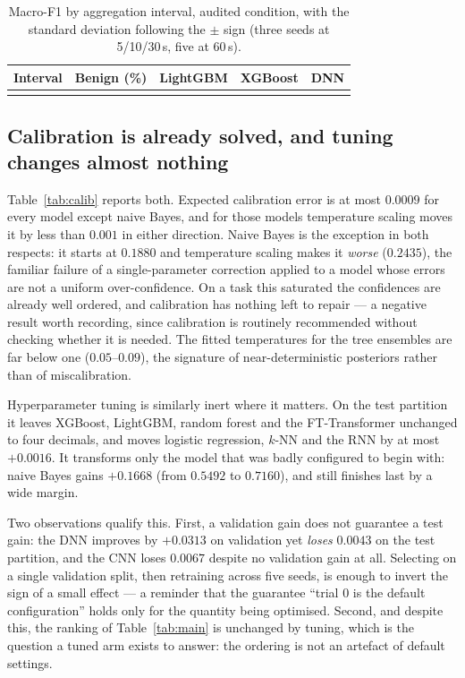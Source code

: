 \documentclass[review,12pt]{elsarticle}
\begin{document}
\begin{table}[t]
\centering
\caption{Macro-F1 by aggregation interval, audited condition, with the standard deviation
following the $\pm$ sign (three seeds at 5/10/30\,s, five at 60\,s).}
\label{tab:intervals-models}
\footnotesize
\begin{tabular}{lrccc}
\toprule
Interval & Benign (\%) & LightGBM & XGBoost & DNN\\
\midrule
\\
\bottomrule
\end{tabular}
\end{table}

\subsection{Calibration is already solved, and tuning changes almost nothing}
\label{sec:calib}
Table~\ref{tab:calib} reports both. Expected calibration error is at most $0.0009$ for
every model except naive Bayes, and for those models temperature scaling moves it by less
than $0.001$ in either direction. Naive Bayes is the exception in both respects: it starts
at $0.1880$ and temperature scaling makes it \emph{worse} ($0.2435$), the familiar failure
of a single-parameter correction applied to a model whose errors are not a uniform
over-confidence. On a task this saturated the confidences are already
well ordered, and calibration has nothing left to repair --- a negative result worth
recording, since calibration is routinely recommended without checking whether it is
needed. The fitted temperatures for the tree ensembles are far below one
($0.05$--$0.09$), the signature of near-deterministic posteriors rather than of
miscalibration.

Hyperparameter tuning is similarly inert where it matters. On the test partition it
leaves XGBoost, LightGBM, random forest and the FT-Transformer unchanged to four decimals,
and moves logistic regression, $k$-NN and the RNN by at most $+0.0016$. It transforms only
the model that was badly configured to begin with: naive Bayes gains $+0.1668$
(from $0.5492$ to $0.7160$), and still finishes last by a wide margin.

Two observations qualify this. First, a validation gain does not guarantee a test gain:
the DNN improves by $+0.0313$ on validation yet \emph{loses} $0.0043$ on the test
partition, and the CNN loses $0.0067$ despite no validation gain at all. Selecting on a
single validation split, then retraining across five seeds, is enough to invert the sign
of a small effect --- a reminder that the guarantee ``trial 0 is the default
configuration'' holds only for the quantity being optimised. Second, and despite this, the
ranking of Table~\ref{tab:main} is unchanged by tuning, which is the question a tuned arm
exists to answer: the ordering is not an artefact of default settings.
\end{document}
